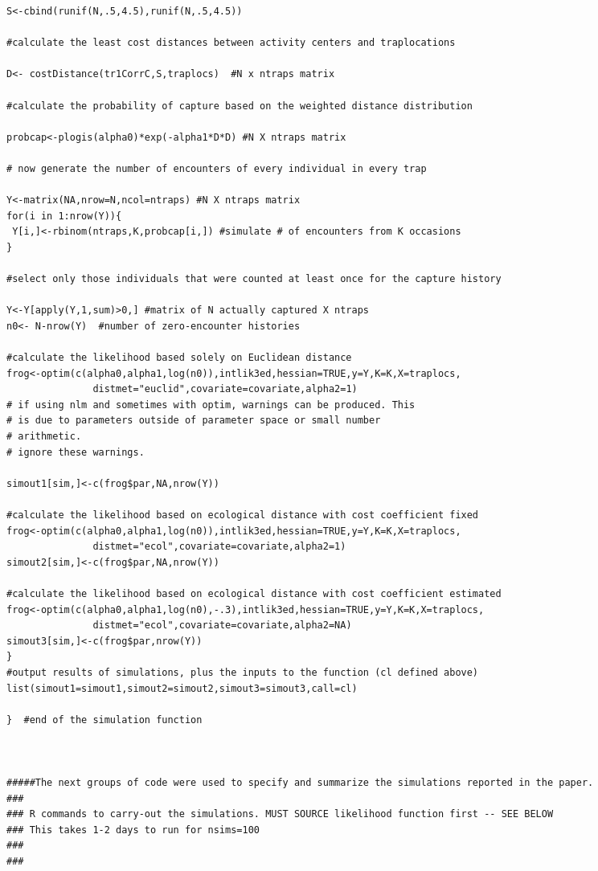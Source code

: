 \documentclass[12pt]{article}
\begin{document}
\begin{spacing}{1.2}
{\begin{verbatim}
S<-cbind(runif(N,.5,4.5),runif(N,.5,4.5))

#calculate the least cost distances between activity centers and traplocations 

D<- costDistance(tr1CorrC,S,traplocs)  #N x ntraps matrix

#calculate the probability of capture based on the weighted distance distribution

probcap<-plogis(alpha0)*exp(-alpha1*D*D) #N X ntraps matrix

# now generate the number of encounters of every individual in every trap

Y<-matrix(NA,nrow=N,ncol=ntraps) #N X ntraps matrix
for(i in 1:nrow(Y)){
 Y[i,]<-rbinom(ntraps,K,probcap[i,]) #simulate # of encounters from K occasions
}

#select only those individuals that were counted at least once for the capture history

Y<-Y[apply(Y,1,sum)>0,] #matrix of N actually captured X ntraps
n0<- N-nrow(Y)  #number of zero-encounter histories

#calculate the likelihood based solely on Euclidean distance
frog<-optim(c(alpha0,alpha1,log(n0)),intlik3ed,hessian=TRUE,y=Y,K=K,X=traplocs,
               distmet="euclid",covariate=covariate,alpha2=1)
# if using nlm and sometimes with optim, warnings can be produced. This
# is due to parameters outside of parameter space or small number 
# arithmetic. 
# ignore these warnings.

simout1[sim,]<-c(frog$par,NA,nrow(Y))

#calculate the likelihood based on ecological distance with cost coefficient fixed
frog<-optim(c(alpha0,alpha1,log(n0)),intlik3ed,hessian=TRUE,y=Y,K=K,X=traplocs,
               distmet="ecol",covariate=covariate,alpha2=1)
simout2[sim,]<-c(frog$par,NA,nrow(Y))

#calculate the likelihood based on ecological distance with cost coefficient estimated
frog<-optim(c(alpha0,alpha1,log(n0),-.3),intlik3ed,hessian=TRUE,y=Y,K=K,X=traplocs,
               distmet="ecol",covariate=covariate,alpha2=NA)
simout3[sim,]<-c(frog$par,nrow(Y))
}
#output results of simulations, plus the inputs to the function (cl defined above) 
list(simout1=simout1,simout2=simout2,simout3=simout3,call=cl)

}  #end of the simulation function



#####The next groups of code were used to specify and summarize the simulations reported in the paper.
###
### R commands to carry-out the simulations. MUST SOURCE likelihood function first -- SEE BELOW
### This takes 1-2 days to run for nsims=100
###
###


\end{verbatim}}
\end{spacing}
\end{document}
